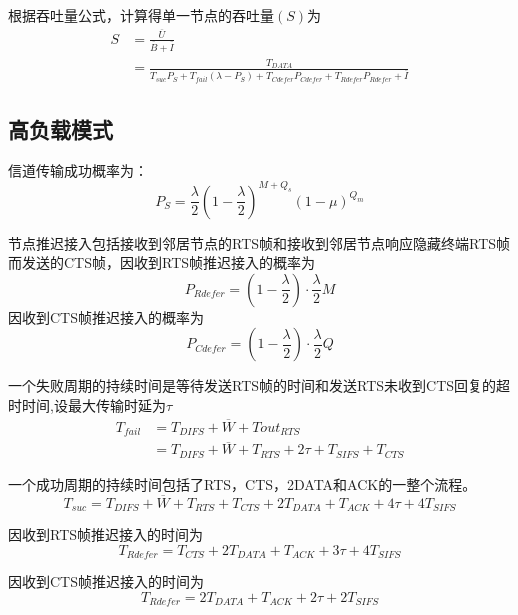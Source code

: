 根据吞吐量公式，计算得单一节点的吞吐量$(S)$为
\begin{equation}
\begin{aligned}
S&=\frac{\overline U}{\overline B+\overline I}\\&=\frac{T_{DATA}}{ T_{suc}P_S+T_{fail}(\lambda-P_S )+ T_{Cdefer}P_{Cdefer}+T_{Rdefer}P_{Rdefer}+\overline I}
\end{aligned}
\end{equation}

\subsection {高负载模式}

信道传输成功概率为：
\begin{equation}
P_S=\frac{\lambda}{2}(1-\frac{\lambda}{2})^{M+Q_s}(1-\mu)^{Q_m}
\end{equation}

节点推迟接入包括接收到邻居节点的RTS帧和接收到邻居节点响应隐藏终端RTS帧而发送的CTS帧，因收到RTS帧推迟接入的概率为
\begin{equation}
P_{Rdefer}=(1-\frac{\lambda}{2})\cdot\frac{\lambda}{2} M
\end{equation}
因收到CTS帧推迟接入的概率为
\begin{equation}
P_{Cdefer}=(1-\frac{\lambda}{2})\cdot\frac{\lambda}{2} Q
\end{equation}

一个失败周期的持续时间是等待发送RTS帧的时间和发送RTS未收到CTS回复的超时时间,设最大传输时延为$\tau$
\begin{equation}
\begin{aligned}
T_{fail}&=T_{DIFS}+\overline W+Tout_{RTS}\\
&=T_{DIFS}+\overline W+T_{RTS}+2\tau+T_{SIFS}+T_{CTS}
\end{aligned}
\end{equation}

一个成功周期的持续时间包括了RTS，CTS，2DATA和ACK的一整个流程。
\begin{equation}
T_{suc}=T_{DIFS}+\overline W+T_{RTS}+T_{CTS}+2T_{DATA}+T_{ACK}+4\tau+4T_{SIFS}
\end{equation}

因收到RTS帧推迟接入的时间为
\begin{equation}
T_{Rdefer}=T_{CTS}+2T_{DATA}+T_{ACK}+3\tau+4T_{SIFS}
\end{equation}

因收到CTS帧推迟接入的时间为
\begin{equation}
T_{Rdefer}=2T_{DATA}+T_{ACK}+2\tau+2T_{SIFS}
\end{equation}

